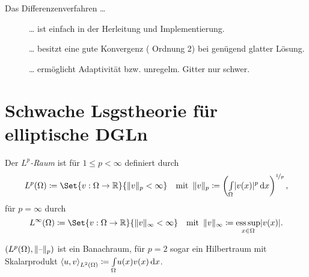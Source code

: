 \documentclass{cheat-sheet}
\newcommand{\Cont}{\mathcal{C}} %
\newcommand{\scp}[2]{\left\langle #1 , #2 \right\rangle} %
\DeclareMathOperator*{\esssup}{ess\,sup} %
\begin{document}
\begin{bem}
  Das Differenzenverfahren \ldots
  \begin{description}
    \item[{\Smiley[1.2]}] \ldots{} ist einfach in der Herleitung und Implementierung. 
    \item[{\Neutrey[1.2]}] \ldots{} besitzt eine gute Konvergenz (\zB{} Ordnung 2) bei genügend glatter Lösung. 
    \item[{\Sadey[1.2]}] \ldots{} ermöglicht Adaptivität bzw. unregelm. Gitter nur schwer. 
  \end{description}
\end{bem}


\section{Schwache Lsgstheorie für elliptische DGLn}

\iffalse
\begin{bspe}
  \begin{itemize}
    \item $u''(x) = f$ in $\Omega = \ointerval{0}{1}$, $u(0) = g_0$, $u'(0) = g_1$
    \item $u_t(x, t) + c u_x(x, t) = 0$, $u(x, 0) = g(x)$, $g \in \Cont^1$. Lösung: $u(x, t) = g(x - c t)$
  \end{itemize}
\end{bspe}
\fi


\begin{defn}
  Der \emph{$L^p$-Raum} ist für $1 \leq p < \infty$ definiert durch
  \[
    L^p(\Omega) \coloneqq \Set{v : \Omega \to \R}{\norm{v}_p < \infty}
    \quad \text{mit} \enspace
    \norm{v}_p \coloneqq \left( \Int{\Omega}{}{\abs{v(x)}^p}{x} \right)^{\nicefrac{1}{p}},
  \]
  für $p = \infty$ durch
  \[
    L^\infty(\Omega) \coloneqq \Set{v : \Omega \to \R}{\norm{v}_\infty < \infty}
    \quad \text{mit} \enspace
    \norm{v}_\infty \coloneqq \esssup_{x \in \Omega} \abs{v(x)}.
  \]
\end{defn}

\begin{bem}
  $(L^p(\Omega), \lVert\text{--}\rVert_p)$ ist ein Banachraum, für $p = 2$ sogar ein Hilbertraum mit Skalarprodukt $\scp{u}{v}_{L^2(\Omega)} \coloneqq \Int{\Omega}{}{u(x) v(x)}{x}$.
\end{bem}
\end{document}

